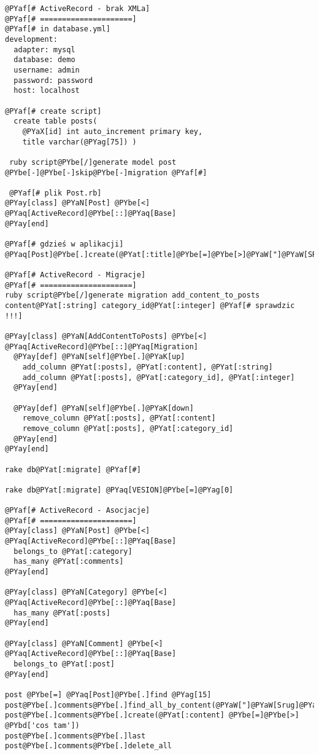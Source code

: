 \begin{Verbatim}[commandchars=@\[\]]
@PYaf[# ActiveRecord - brak XMLa]
@PYaf[# =====================]
@PYaf[# in database.yml]
development:
  adapter: mysql
  database: demo
  username: admin
  password: password
  host: localhost

@PYaf[# create script]
  create table posts(
    @PYaX[id] int auto_increment primary key,
    title varchar(@PYag[75]) )

 ruby script@PYbe[/]generate model post  @PYbe[-]@PYbe[-]skip@PYbe[-]migration @PYaf[#]

 @PYaf[# plik Post.rb]
@PYay[class] @PYaN[Post] @PYbe[<] @PYaq[ActiveRecord]@PYbe[::]@PYaq[Base]
@PYay[end]

@PYaf[# gdzieś w aplikacji]
@PYaq[Post]@PYbe[.]create(@PYat[:title]@PYbe[=]@PYbe[>]@PYaW["]@PYaW[SRUG]@PYaW["])

@PYaf[# ActiveRecord - Migracje]
@PYaf[# =====================]
ruby script@PYbe[/]generate migration add_content_to_posts content@PYat[:string] category_id@PYat[:integer] @PYaf[# sprawdzic !!!]

@PYay[class] @PYaN[AddContentToPosts] @PYbe[<] @PYaq[ActiveRecord]@PYbe[::]@PYaq[Migration]
  @PYay[def] @PYaN[self]@PYbe[.]@PYaK[up]
    add_column @PYat[:posts], @PYat[:content], @PYat[:string]
    add_column @PYat[:posts], @PYat[:category_id], @PYat[:integer]
  @PYay[end]

  @PYay[def] @PYaN[self]@PYbe[.]@PYaK[down]
    remove_column @PYat[:posts], @PYat[:content]
    remove_column @PYat[:posts], @PYat[:category_id]
  @PYay[end]
@PYay[end]

rake db@PYat[:migrate] @PYaf[#]

rake db@PYat[:migrate] @PYaq[VESION]@PYbe[=]@PYag[0]

@PYaf[# ActiveRecord - Asocjacje]
@PYaf[# =====================]
@PYay[class] @PYaN[Post] @PYbe[<] @PYaq[ActiveRecord]@PYbe[::]@PYaq[Base]
  belongs_to @PYat[:category]
  has_many @PYat[:comments]
@PYay[end]

@PYay[class] @PYaN[Category] @PYbe[<] @PYaq[ActiveRecord]@PYbe[::]@PYaq[Base]
  has_many @PYat[:posts]
@PYay[end]

@PYay[class] @PYaN[Comment] @PYbe[<] @PYaq[ActiveRecord]@PYbe[::]@PYaq[Base]
  belongs_to @PYat[:post]
@PYay[end]

post @PYbe[=] @PYaq[Post]@PYbe[.]find @PYag[15]
post@PYbe[.]comments@PYbe[.]find_all_by_content(@PYaW["]@PYaW[Srug]@PYaW["])
post@PYbe[.]comments@PYbe[.]create(@PYat[:content] @PYbe[=]@PYbe[>] @PYbd['cos tam'])
post@PYbe[.]comments@PYbe[.]last
post@PYbe[.]comments@PYbe[.]delete_all


\end{Verbatim}
